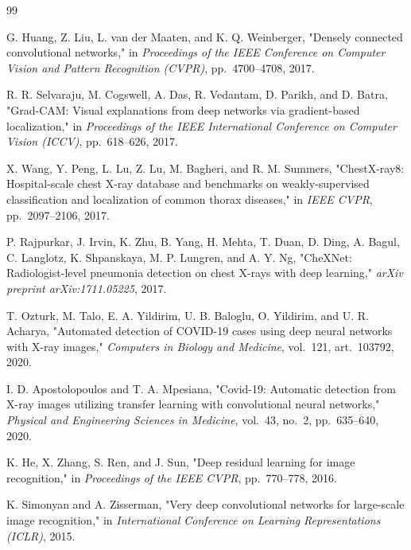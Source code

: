 \documentclass[12pt,a4paper]{report}
\begin{document}
\begin{thebibliography}{99}
\sloppy

G. Huang, Z. Liu, L. van der Maaten, and K. Q. Weinberger, "Densely connected convolutional networks," in \textit{Proceedings of the IEEE Conference on Computer Vision and Pattern Recognition (CVPR)}, pp.~4700--4708, 2017.

R. R. Selvaraju, M. Cogswell, A. Das, R. Vedantam, D. Parikh, and D. Batra, "Grad-CAM: Visual explanations from deep networks via gradient-based localization," in \textit{Proceedings of the IEEE International Conference on Computer Vision (ICCV)}, pp.~618--626, 2017.

X. Wang, Y. Peng, L. Lu, Z. Lu, M. Bagheri, and R. M. Summers, "ChestX-ray8: Hospital-scale chest X-ray database and benchmarks on weakly-supervised classification and localization of common thorax diseases," in \textit{IEEE CVPR}, pp.~2097--2106, 2017.

P. Rajpurkar, J. Irvin, K. Zhu, B. Yang, H. Mehta, T. Duan, D. Ding, A. Bagul, C. Langlotz, K. Shpanskaya, M. P. Lungren, and A. Y. Ng, "CheXNet: Radiologist-level pneumonia detection on chest X-rays with deep learning," \textit{arXiv preprint arXiv:1711.05225}, 2017.

T. Ozturk, M. Talo, E. A. Yildirim, U. B. Baloglu, O. Yildirim, and U. R. Acharya, "Automated detection of COVID-19 cases using deep neural networks with X-ray images," \textit{Computers in Biology and Medicine}, vol.~121, art.~103792, 2020.

I. D. Apostolopoulos and T. A. Mpesiana, "Covid-19: Automatic detection from X-ray images utilizing transfer learning with convolutional neural networks," \textit{Physical and Engineering Sciences in Medicine}, vol.~43, no.~2, pp.~635--640, 2020.

K. He, X. Zhang, S. Ren, and J. Sun, "Deep residual learning for image recognition," in \textit{Proceedings of the IEEE CVPR}, pp.~770--778, 2016.

K. Simonyan and A. Zisserman, "Very deep convolutional networks for large-scale image recognition," in \textit{International Conference on Learning Representations (ICLR)}, 2015.


\end{thebibliography}
\end{document}

